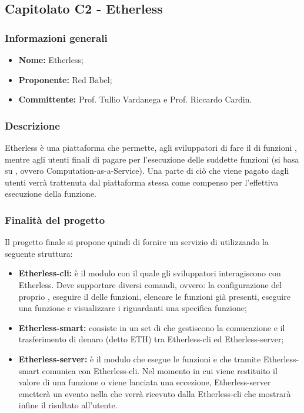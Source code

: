 \subsection{Capitolato C2 - Etherless}
	 \subsubsection{Informazioni generali}
       	\begin{itemize}
						\item \textbf{Nome:} Etherless;
         	  \item \textbf{Proponente: }Red Babel;
          	\item \textbf{Committente: }Prof. Tullio Vardanega e Prof. Riccardo Cardin.
         \end{itemize}
	\subsubsection{Descrizione}
       Etherless è una piattaforma  che permette, agli sviluppatori di fare il  di funzioni , mentre  agli utenti finali di pagare per l'esecuzione delle suddette funzioni (si basa su , ovvero Computation-as-a-Service).
       Una parte di ciò che viene pagato dagli utenti verrà trattenuta dal piattaforma stessa come compenso per l'effettiva esecuzione della funzione.
    \subsubsection{Finalità del progetto}
     Il progetto finale si propone quindi di fornire un servizio di  utilizzando la seguente struttura:
    		 \begin{itemize}
    			\item \textbf{Etherless-cli: }è il modulo con il quale gli sviluppatori interagiscono con Etherless. Deve supportare diversi comandi, ovvero: la configurazione del proprio , eseguire il  delle funzioni, elencare le funzioni già presenti, eseguire una funzione e visualizzare i  riguardanti una specifica funzione;
    			\item \textbf{Etherless-smart: }consiste in un set di  che gestiscono la comucazione e il trasferimento di denaro (detto ETH) tra Etherless-cli ed Etherless-server;
    			\item \textbf{Etherless-server: }è il modulo che esegue le funzioni e che tramite Etherless-smart comunica con Etherless-cli.  Nel momento in cui viene restituito il valore di una funzione o viene lanciata una eccezione, Etherless-server emetterà un evento nella  che verrà ricevuto dalla Etherless-cli che mostrarà infine il risultato all'utente.
		\end{itemize}
